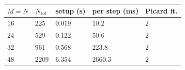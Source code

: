 \begin{tabular}{lllll}
\toprule
\(M=N\) & \(N_{\mathrm{tot}}\) & setup (s) & per step (ms) & Picard it. \\
\midrule
\(16\) & \(225\) & \(0.019\) & \(10.2\) & \(2\) \\
\(24\) & \(529\) & \(0.122\) & \(50.6\) & \(2\) \\
\(32\) & \(961\) & \(0.568\) & \(223.8\) & \(2\) \\
\(48\) & \(2209\) & \(6.354\) & \(2660.3\) & \(2\) \\
\bottomrule
\end{tabular}
